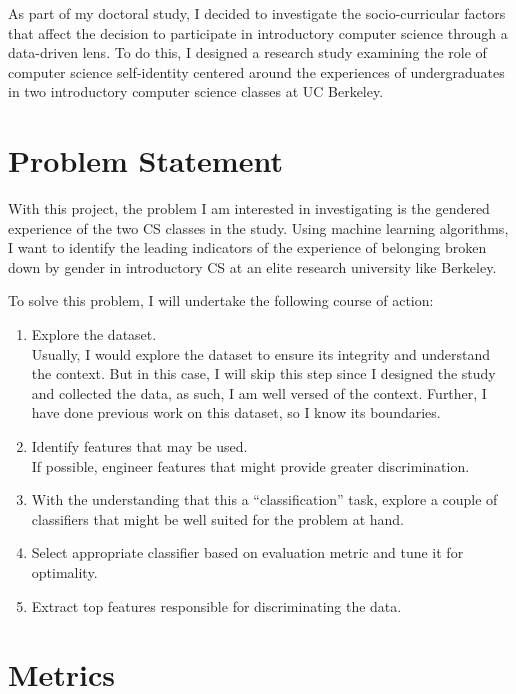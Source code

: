 As part of my doctoral study, I decided to investigate the socio-curricular factors that affect the decision to participate in introductory computer science through a data-driven lens. To do this, I designed a research study examining the role of computer science self-identity centered around the experiences of undergraduates in two introductory computer science classes at UC Berkeley. 


\section*{Problem Statement}

With this project, the problem I am interested in investigating is the gendered experience of the two CS classes in the study. Using machine learning algorithms, I want to identify the leading indicators of the experience of belonging broken down by gender in introductory CS at an elite research university like Berkeley.

To solve this problem, I will undertake the following course of action:
\begin{enumerate}%
\item Explore the dataset.\\
Usually, I would explore the dataset to ensure its integrity and understand the context. But in this case, I will skip this step since I designed the study and collected the data, as such, I am well versed of the context. Further, I have done previous work on this dataset, so I know its boundaries.
\item Identify features that may be used.\\ 
If possible, engineer features that might provide greater discrimination.
\item With the understanding that this a ``classification'' task, explore a couple of classifiers that might be well suited for the problem at hand.
\item Select appropriate classifier based on evaluation metric and tune it for optimality.
\item Extract top features responsible for discriminating the data.
\end{enumerate}

\section*{Metrics}

